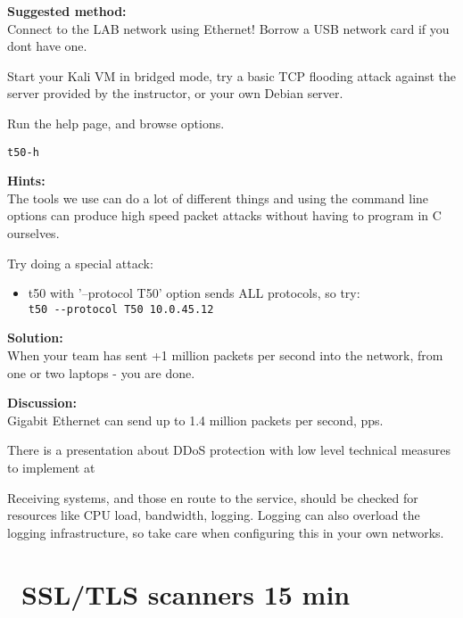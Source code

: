 \documentclass[a4paper,11pt,notitlepage]{report}
\begin{document}
{\bf Suggested method:}\\
Connect to the LAB network using Ethernet! Borrow a USB network card if you dont have one.

Start your Kali VM in bridged mode, try a basic TCP flooding attack against the server provided by the instructor, or your own Debian server.

Run the help page, and browse options.
\begin{alltt}\footnotesize
t50 -h
\end{alltt}





{\bf Hints:}\\
The tools we use can do a lot of different things and using the command line options can produce high speed packet attacks without having to program in C ourselves.

Try doing a special attack:
\begin{itemize}
\item t50 with '--protocol T50' option sends ALL protocols, so try:\\
\verb+t50 --protocol T50 10.0.45.12+
\end{itemize}


{\bf Solution:}\\
When your team has sent +1 million packets per second into the network, from one or two laptops - you are done.

{\bf Discussion:}\\
Gigabit Ethernet can send up to 1.4 million packets per second, pps.

There is a presentation about DDoS protection with low level technical measures to implement at\\
{\footnotesize {}}

Receiving systems, and those en route to the service, should be checked for resources like CPU load, bandwidth, logging. Logging can also overload the logging infrastructure, so take care when configuring this in your own networks.





\chapter{\faInfoCircle\ SSL/TLS scanners 15 min}
\label{ex:SSLScanner}
\end{document}
